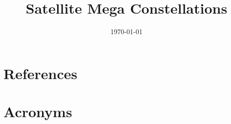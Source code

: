 \documentclass[modern]{aastex62}
\begin{document}

\date{\today}
\title{Satellite Mega Constellations}





\appendix
\section{References} \label{sec:bib}



\section{Acronyms} \label{sec:acronyms}

\end{document}

